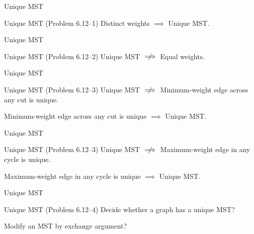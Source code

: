 \begin{frame}{Unique MST}
  \begin{exampleblock}{Unique MST (Problem 6.12--1)}
    Distinct weights $\implies$ Unique MST.
  \end{exampleblock}
\end{frame}
\begin{frame}{Unique MST}
  \begin{exampleblock}{Unique MST (Problem 6.12--2)}
	Unique MST $\centernot\implies$ Equal weights.
  \end{exampleblock}

\end{frame}
\begin{frame}{Unique MST}
  \begin{exampleblock}{Unique MST (Problem 6.12--3)}
	Unique MST $\centernot\implies$ Minimum-weight edge across any cut is unique.
  \end{exampleblock}


  \begin{theorem}
    Minimum-weight edge across any cut is unique $\implies$ Unique MST.
  \end{theorem}
\end{frame}
\begin{frame}{Unique MST}
  \begin{exampleblock}{Unique MST (Problem 6.12--3)}
    Unique MST $\centernot\implies$ Maximum-weight edge in any cycle is unique.
  \end{exampleblock}


  \begin{theorem}[Conjecture]
	Maximum-weight edge in any cycle is unique $\implies$ Unique MST.
  \end{theorem}
\end{frame}
\begin{frame}{Unique MST}
  \begin{exampleblock}{Unique MST (Problem 6.12--4)}
	Decide whether a graph has a unique MST?
  \end{exampleblock}

  \vspace{0.60cm}
  \centerline{Modify an MST by exchange argument?}
\end{frame}

